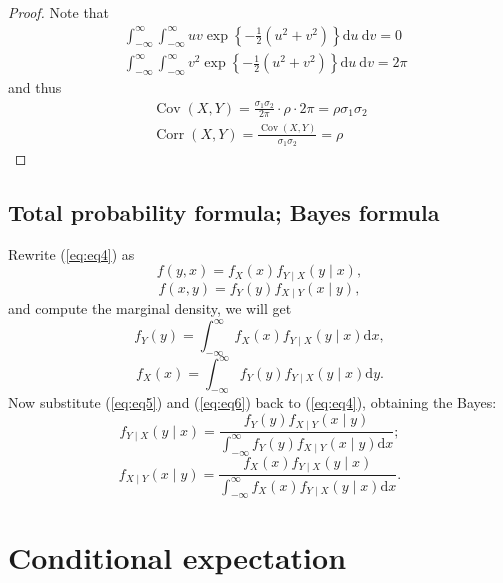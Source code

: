 \documentclass[11pt,singlecolumn, openany, citestyle=authoryear]{elegantbook}
\begin{document}
\begin{CJK}{UTF8}{gbsn}
\begin{proof}
Note that 
$$
\begin{aligned}
& \int_{-\infty}^{\infty} \int_{-\infty}^{\infty} u v \exp \left\{-\frac{1}{2}\left(u^2+v^2\right)\right\} \mathrm{d} u \mathrm{~d} v=0 \\
& \int_{-\infty}^{\infty} \int_{-\infty}^{\infty} v^2 \exp \left\{-\frac{1}{2}\left(u^2+v^2\right)\right\} \mathrm{d} u \mathrm{~d} v=2 \pi
\end{aligned}
$$
and thus 
$$
\begin{gathered}
\operatorname{Cov}(X, Y)=\frac{\sigma_1 \sigma_2}{2 \pi} \cdot \rho \cdot 2 \pi=\rho \sigma_1 \sigma_2 \\
\operatorname{Corr}(X, Y)=\frac{\operatorname{Cov}(X, Y)}{\sigma_1 \sigma_2}=\rho
\end{gathered}
$$
\end{proof}

\subsection{Total probability formula; Bayes formula}
Rewrite (\ref{eq:eq4}) as 
\begin{equation}
    f(y,x)=f_X(x)f_{Y\mid X}(y\mid x),
\end{equation}
\begin{equation}\label{eq:eq5}
    f(x,y)=f_Y(y)f_{X\mid Y}(x\mid y), 
\end{equation}
and compute the marginal density, we will get 
\begin{equation}
    f_Y(y)=\int_{-\infty}^\infty f_X(x)f_{Y\mid X}(y\mid x)\mathrm{d}x,
\end{equation}
\begin{equation}\label{eq:eq6}
    f_X(x)=\int_{-\infty}^\infty f_Y(y)f_{Y\mid X}(y\mid x)\mathrm{d}y.
\end{equation}
Now substitute (\ref{eq:eq5}) and (\ref{eq:eq6}) back to (\ref{eq:eq4}), obtaining 
the Bayes:
\begin{equation}
    f_{Y\mid X}(y\mid x)=\frac{f_Y(y)f_{X\mid Y}(x\mid y)}{
    \displaystyle \int_{-\infty}^\infty f_Y(y)f_{X\mid Y}(x\mid y)\mathrm{d}x
    };
\end{equation}
\begin{equation}
    f_{X\mid Y}(x\mid y)=\frac{f_X(x)f_{Y\mid X}(y\mid x)}{
       \displaystyle \int_{-\infty}^\infty f_X(x)f_{Y\mid X}(y\mid x)\mathrm{d}x
    }.
\end{equation}

\section{Conditional expectation}

\end{CJK}
\end{document}
